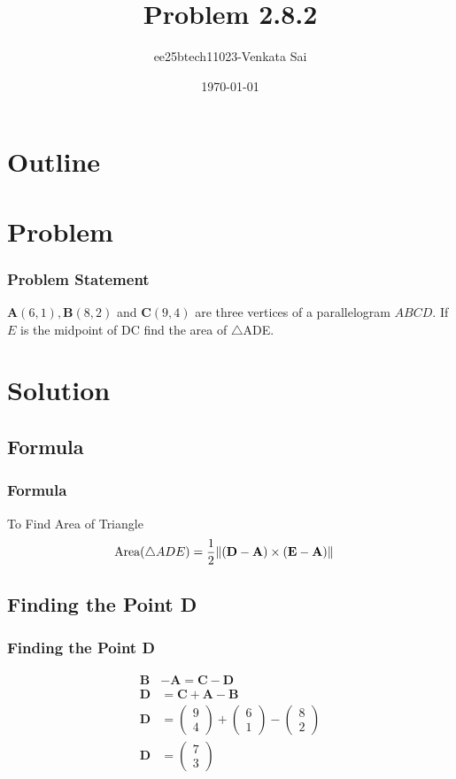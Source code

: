 \documentclass{beamer}
\title{Problem 2.8.2}
\author{ee25btech11023-Venkata Sai}
\date{\today}
\providecommand{\brak}[1]{\ensuremath{\left(#1\right)}}
\theoremstyle{remark}
\providecommand{\norm}[1]{\lVert#1\rVert}
\newcommand{\myvec}[1]{\ensuremath{\begin{pmatrix}#1\end{pmatrix}}}
\let\vec\mathbf
\numberwithin{equation}{section}
\begin{document}
\begin{frame}
\titlepage
\end{frame}

\section*{Outline}
\begin{frame}
\tableofcontents
\end{frame}
\section{Problem}
\begin{frame}
\frametitle{Problem Statement}
%
$\vec{A}\brak{6,1},\vec{B}\brak{8, 2}$ and $\vec{C}\brak{9, 4}$ are three vertices of a parallelogram $ABCD$. If $E$ is the
midpoint of DC find the area of $\triangle$ADE. 
\end{frame}
\section{Solution}
\subsection{Formula}
\begin{frame}
\frametitle{Formula}
\setcounter{section}{1}
To Find Area of Triangle
\begin{align}
\text{Area\brak{\triangle ADE}}&=\frac12\norm{\brak{\vec{D}-\vec{A}}\times\brak{\vec{E}-\vec{A}}}
\end{align}

\end{frame}
\subsection{Finding the Point D}
\begin{frame}
\frametitle{Finding the Point D}

\begin{align}
\vec{B}&-\vec{A}=\vec{C}-\vec{D} \\
    \vec{D}&=\vec{C}+\vec{A}-\vec{B} \\
    \vec{D}&=\myvec{9\\4}+\myvec{6\\1}-\myvec{8\\2} \\
    \vec{D}&=\myvec{7\\3}
\end{align}
\end{frame}
\end{document}
